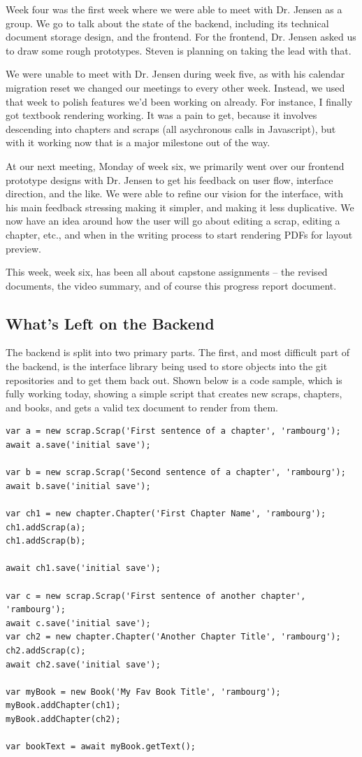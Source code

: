 \documentclass[onecolumn, draftclsnofoot,10pt, compsoc]{IEEEtran}
\begin{document}
Week four was the first week where we were able to meet with Dr. Jensen as a
group. We go to talk about the state of the backend, including its technical
document storage design, and the frontend. For the frontend, Dr. Jensen asked
us to draw some rough prototypes. Steven is planning on taking the lead with
that.

We were unable to meet with Dr. Jensen during week five, as with his calendar
migration reset we changed our meetings to every other week. Instead, we used
that week to polish features we'd been working on already. For instance, I
finally got textbook rendering working. It was a pain to get, because it
involves descending into chapters and scraps (all asychronous calls in
Javascript), but with it working now that is a major milestone out of the way.

At our next meeting, Monday of week six, we primarily went over our frontend
prototype designs with Dr. Jensen to get his feedback on user flow, interface
direction, and the like. We were able to refine our vision for the interface,
with his main feedback stressing making it simpler, and making it less
duplicative. We now have an idea around how the user will go about editing a
scrap, editing  a chapter, etc., and when in the writing process to start
rendering PDFs for layout preview.

This week, week six, has been all about capstone assignments -- the revised
documents, the video summary, and of course this progress report document.

\subsection{What's Left on the Backend}
The backend is split into two primary parts. The first, and most difficult part
of the backend, is the interface library being used to store objects into the
git repositories and to get them back out. Shown below is a code sample, which
is fully working today, showing a simple script that creates new scraps,
chapters, and books, and gets a valid tex document to render from them.

\begin{verbatim}
var a = new scrap.Scrap('First sentence of a chapter', 'rambourg');
await a.save('initial save');

var b = new scrap.Scrap('Second sentence of a chapter', 'rambourg');
await b.save('initial save');

var ch1 = new chapter.Chapter('First Chapter Name', 'rambourg');
ch1.addScrap(a);
ch1.addScrap(b);

await ch1.save('initial save');

var c = new scrap.Scrap('First sentence of another chapter', 'rambourg');
await c.save('initial save');
var ch2 = new chapter.Chapter('Another Chapter Title', 'rambourg');
ch2.addScrap(c);
await ch2.save('initial save');

var myBook = new Book('My Fav Book Title', 'rambourg');
myBook.addChapter(ch1);
myBook.addChapter(ch2);

var bookText = await myBook.getText();
\end{verbatim}
\end{document}

